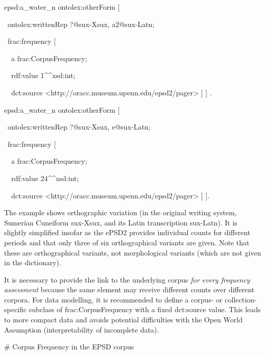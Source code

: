 \documentclass[a4paper]{article}
\newcommand\textstyleEmphasis[1]{\textit{#1}}
\newcommand\textstyleSourceText[1]{\textrm{#1}}
\begin{document}
\bigskip

\textstyleSourceText{epsd:a\_water\_n ontolex:otherForm [}

\textstyleSourceText{\ ontolex:writtenRep {\textquotedbl}?{\textquotedbl}@sux-Xsux, {\textquotedbl}a2{\textquotedbl}@sux-Latn;}

\textstyleSourceText{\ frac:frequency [}

\textstyleSourceText{\ \ a frac:CorpusFrequency;}

\textstyleSourceText{\ \ rdf:value {\textquotedbl}1{\textquotedbl}\^{}\^{}xsd:int;}

\textstyleSourceText{\ \ dct:source {\textless}http://oracc.museum.upenn.edu/epsd2/pager{\textgreater} ] ] .}


\bigskip

\textstyleSourceText{epsd:a\_water\_n ontolex:otherForm [}

\textstyleSourceText{\ ontolex:writtenRep {\textquotedbl}?{\textquotedbl}@sux-Xsux, {\textquotedbl}e{\textquotedbl}@sux-Latn;}

\textstyleSourceText{\ frac:frequency [}

\textstyleSourceText{\ \ a frac:CorpusFrequency;}

\textstyleSourceText{\ \ rdf:value {\textquotedbl}24{\textquotedbl}\^{}\^{}xsd:int;}

\textstyleSourceText{\ \ dct:source {\textless}http://oracc.museum.upenn.edu/epsd2/pager{\textgreater} ] ].}

The example shows orthographic variation (in the original writing system, Sumerian Cuneiform sux-Xsux, and its Latin transcription sux-Latn). It is slightly simplified insofar as the ePSD2 provides individual counts for different periods and that only three of six orthographical variants are given. Note that these are orthographical variants, not morphological variants (which are not given in the dictionary). 

It is necessary to provide the link to the underlying corpus \textstyleEmphasis{for every frequency assessment} because the same element may receive different counts over different corpora. For data modelling, it is recommended to define a corpus- or collection-specific subclass of frac:CorpusFrequency with a fixed dct:source value. This leads to more compact data and avoids potential difficulties with the Open World Assumption (interpretability of incomplete data). 


\bigskip

\textstyleSourceText{\# Corpus Frequency in the EPSD corpus}
\end{document}

